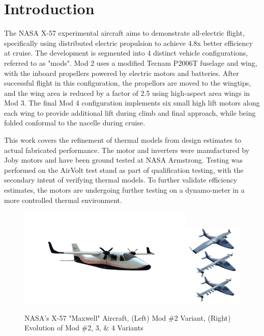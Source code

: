 \documentclass[]{aiaa-tc}%
\begin{document}
\newpage


\section{Introduction}

The NASA X-57 experimental aircraft aims to demonstrate all-electric flight, specifically using distributed electric propulsion to achieve 4.8x better efficiency at cruise. The development is segmented into 4 distinct vehicle configurations, referred to as "mods". Mod 2 uses a modified Tecnam P2006T fuselage and wing, with the inboard propellers powered by electric motors and batteries. After successful flight in this configuration, the propellors are moved to the wingtips, and the wing area is reduced by a factor of 2.5 using high-aspect area wings in Mod 3. The final Mod 4 configuration implements six small high lift motors along each wing to provide additional lift during climb and final approach, while being folded conformal to the nacelle during cruise. \cite{falck_X57}
\cite{Borer_2016}

This work covers the refinement of thermal models from design estimates to actual fabricated performance. The motor and inverters were manufactured by Joby motors and have been ground tested at NASA Armstrong. Testing was performed on the AirVolt test stand as part of qualification testing, with the secondary intent of verifying thermal models. To further validate efficiency estimates, the motors are undergoing further testing on a dynamo-meter in a more controlled thermal environment.

\begin{figure}[!htb]%
	\centering
	\includegraphics[width=0.75\textwidth]{figures/X57_mod2.png}\includegraphics[width=0.25\textwidth]{figures/Mod234.png}
	\caption{NASA's X-57 "Maxwell" Aircraft, (Left) Mod \#2 Variant, (Right) Evolution of Mod \#2, 3, \& 4 Variants}
	\label{fig:Mod2Big}
\end{figure}
\end{document}
